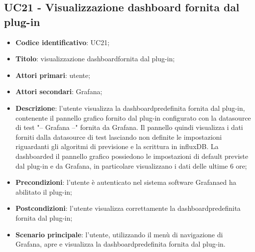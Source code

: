 \subsection{UC21 - Visualizzazione dashboard fornita dal plug-in}
\begin{itemize}
	\item \textbf{Codice identificativo}: UC21;
	\item \textbf{Titolo}: visualizzazione dashboard\glosp fornita dal plug-in;
	\item \textbf{Attori primari}: utente;
	\item \textbf{Attori secondari}: Grafana\glo;
	\item \textbf{Descrizione}: l'utente visualizza la dashboard\glosp predefinita fornita dal plug-in, contenente il pannello grafico fornito dal plug-in configurato con la datasource di test "-- Grafana --" fornita da Grafana\glo. Il pannello quindi visualizza i dati forniti dalla datasource di test lasciando non definite le impostazioni riguardanti gli algoritmi di previsione e la scrittura in influxDB. La dashboard\glosp ed il pannello grafico possiedono le impostazioni di default previste dal plug-in e da Grafana\glo, in particolare visualizzano i dati delle ultime 6 ore;
	\item \textbf{Precondizioni}: l'utente è autenticato nel sistema software Grafana\glosp ed ha abilitato il plug-in;
	\item \textbf{Postcondizioni}: l'utente visualizza correttamente la dashboard\glosp predefinita fornita dal plug-in;
	\item \textbf{Scenario principale}: l'utente, utilizzando il menù di navigazione di Grafana\glo, apre e visualizza la dashboard\glosp predefinita fornita dal plug-in.
\end{itemize} 
